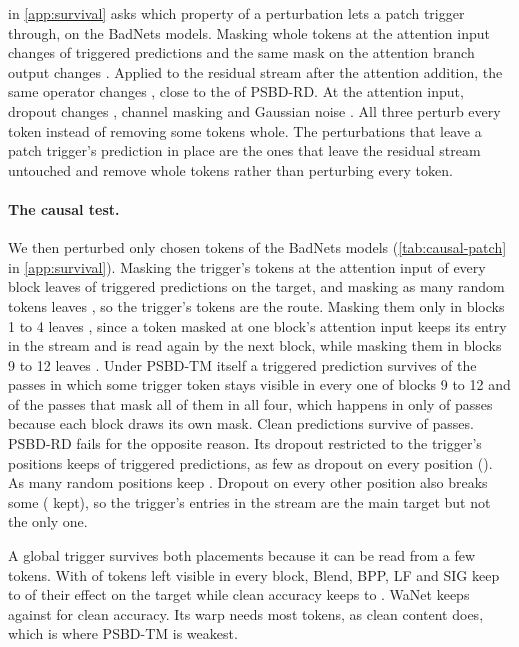  in \cref{app:survival} asks which property of a perturbation lets a patch trigger through, on the \SurvivalSiteModels{} BadNets models. Masking whole tokens at the attention input changes \SurvivalSiteMaskAttentionInputTriggered{} of triggered predictions and the same mask on the attention branch output changes \SurvivalSiteMaskAttentionOutputTriggered{}. Applied to the residual stream after the attention addition, the same operator changes \SurvivalSiteMaskStreamTriggered{}, close to the \SurvivalSiteDropoutStreamTriggered{} of PSBD-RD. At the attention input, dropout changes \SurvivalSiteDropoutAttentionInputTriggered{}, channel masking \SurvivalSiteChannelAttentionInputTriggered{} and Gaussian noise \SurvivalSiteNoiseAttentionInputTriggered{}. All three perturb every token instead of removing some tokens whole. The perturbations that leave a patch trigger's prediction in place are the ones that leave the residual stream untouched and remove whole tokens rather than perturbing every token.


\paragraph{The causal test.}
We then perturbed only chosen tokens of the \CausalModels{} BadNets models (\cref{tab:causal-patch} in \cref{app:survival}). Masking the trigger's tokens at the attention input of every block leaves \CausalMaskAllOneTwo{} of triggered predictions on the target, and masking as many random tokens leaves \CausalMaskRandomAllOneTwo{}, so the trigger's tokens are the route. Masking them only in blocks 1 to 4 leaves \CausalMaskBlocksOneFour{}, since a token masked at one block's attention input keeps its entry in the stream and is read again by the next block, while masking them in blocks 9 to 12 leaves \CausalMaskBlocksNineOneTwo{}. Under PSBD-TM itself a triggered prediction survives \CausalTmLateNone{} of the passes in which some trigger token stays visible in every one of blocks 9 to 12 and \CausalTmLateAll{} of the passes that mask all of them in all four, which happens in only \CausalTmLateAllShare{} of passes because each block draws its own mask. Clean predictions survive \CausalTmCleanKept{} of passes. PSBD-RD fails for the opposite reason. Its dropout restricted to the trigger's positions keeps \CausalRdTriggerOnly{} of triggered predictions, as few as dropout on every position (\CausalRdAllTokens{}). As many random positions keep \CausalRdRandomSameCount{}. Dropout on every other position also breaks some (\CausalRdAllButTrigger{} kept), so the trigger's entries in the stream are the main target but not the only one.

A global trigger survives both placements because it can be read from a few tokens. With \CausalVisibleShare{} of tokens left visible in every block, Blend, BPP, LF and SIG keep \CausalVisibleGlobalTriggerMin{} to \CausalVisibleGlobalTriggerMax{} of their effect on the target while clean accuracy keeps \CausalVisibleGlobalCleanMin{} to \CausalVisibleGlobalCleanMax{}. WaNet keeps \CausalVisibleWanetTrigger{} against \CausalVisibleWanetClean{} for clean accuracy. Its warp needs most tokens, as clean content does, which is where PSBD-TM is weakest.
